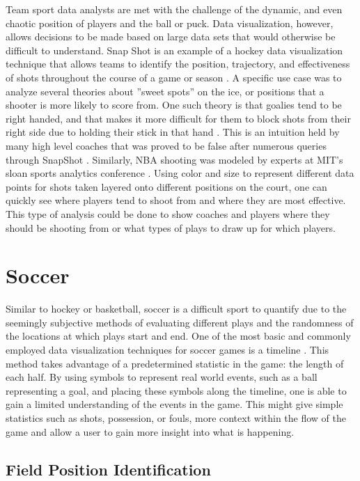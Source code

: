 \documentclass[sigconf]{acmart}
\begin{document}
Team sport data analysts are met with the challenge of the dynamic, and even chaotic position of players and the ball or puck. Data visualization, however, allows decisions to be made based on large data sets that would otherwise be difficult to understand. Snap Shot is an example of a hockey data visualization technique that allows teams to identify the position, trajectory, and effectiveness of shots throughout the course of a game or season \cite{SnapShot}. A specific use case was to analyze several theories about ''sweet spots'' on the ice, or positions that a shooter is more likely to score from. One such theory is that goalies tend to be right handed, and that makes it more difficult for them to block shots from their right side due to holding their stick in that hand \cite{SnapShot}. This is an intuition held by many high level coaches that was proved to be false after numerous queries through SnapShot \cite{SnapShot}. Similarly, NBA shooting was modeled by experts at MIT's sloan sports analytics conference \cite{CourtVision}. Using color and size to represent different data points for shots taken layered onto different positions on the court, one can quickly see where players tend to shoot from and where they are most effective. This type of analysis could be done to show coaches and players where they should be shooting from or what types of plays to draw up for which players.

\section{Soccer}

Similar to hockey or basketball, soccer is a difficult sport to quantify due to the seemingly subjective methods of evaluating different plays and the randomness of the locations at which plays start and end. One of the most basic and commonly employed data visualization techniques for soccer games is a timeline \cite{SoccerStories}. This method takes advantage of a predetermined statistic in the game: the length of each half. By using symbols to represent real world events, such as a ball representing a goal, and placing these symbols along the timeline, one is able to gain a limited understanding of the events in the game. This might give simple statistics such as shots, possession, or fouls, more context within the flow of the game and allow a user to gain more insight into what is happening. 

\subsection{Field Position Identification}
\end{document}
